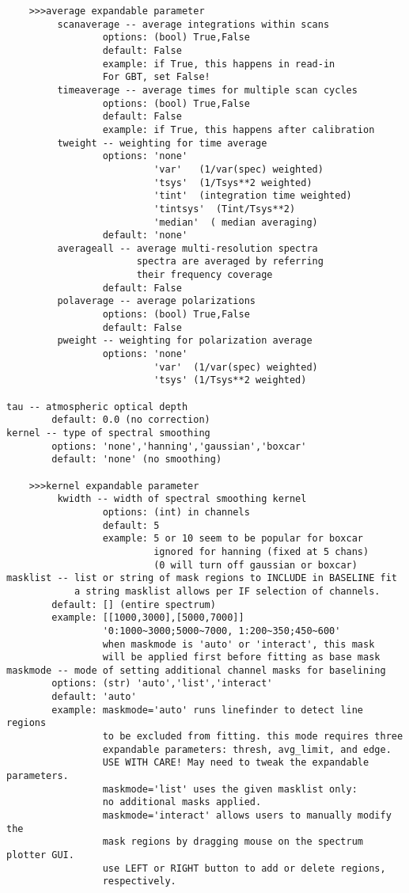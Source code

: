 \begin{verbatim}
    >>>average expandable parameter
         scanaverage -- average integrations within scans
                 options: (bool) True,False
                 default: False
                 example: if True, this happens in read-in
                 For GBT, set False!
         timeaverage -- average times for multiple scan cycles
                 options: (bool) True,False
                 default: False
                 example: if True, this happens after calibration
         tweight -- weighting for time average
                 options: 'none'
                          'var'   (1/var(spec) weighted)
                          'tsys'  (1/Tsys**2 weighted)
                          'tint'  (integration time weighted)
                          'tintsys'  (Tint/Tsys**2)
                          'median'  ( median averaging)
                 default: 'none'
         averageall -- average multi-resolution spectra
                       spectra are averaged by referring 
                       their frequency coverage
                 default: False
         polaverage -- average polarizations
                 options: (bool) True,False
                 default: False
         pweight -- weighting for polarization average
                 options: 'none'
                          'var'  (1/var(spec) weighted)
                          'tsys' (1/Tsys**2 weighted)

tau -- atmospheric optical depth
        default: 0.0 (no correction)
kernel -- type of spectral smoothing
        options: 'none','hanning','gaussian','boxcar'
        default: 'none' (no smoothing)

    >>>kernel expandable parameter
         kwidth -- width of spectral smoothing kernel
                 options: (int) in channels
                 default: 5
                 example: 5 or 10 seem to be popular for boxcar
                          ignored for hanning (fixed at 5 chans)
                          (0 will turn off gaussian or boxcar)
masklist -- list or string of mask regions to INCLUDE in BASELINE fit
            a string masklist allows per IF selection of channels.
        default: [] (entire spectrum)
        example: [[1000,3000],[5000,7000]]
                 '0:1000~3000;5000~7000, 1:200~350;450~600'
                 when maskmode is 'auto' or 'interact', this mask 
                 will be applied first before fitting as base mask
maskmode -- mode of setting additional channel masks for baselining
        options: (str) 'auto','list','interact'
        default: 'auto'
        example: maskmode='auto' runs linefinder to detect line regions 
                 to be excluded from fitting. this mode requires three 
                 expandable parameters: thresh, avg_limit, and edge.
                 USE WITH CARE! May need to tweak the expandable parameters.
                 maskmode='list' uses the given masklist only: 
                 no additional masks applied.
                 maskmode='interact' allows users to manually modify the 
                 mask regions by dragging mouse on the spectrum plotter GUI.
                 use LEFT or RIGHT button to add or delete regions, 
                 respectively.


\end{verbatim}
